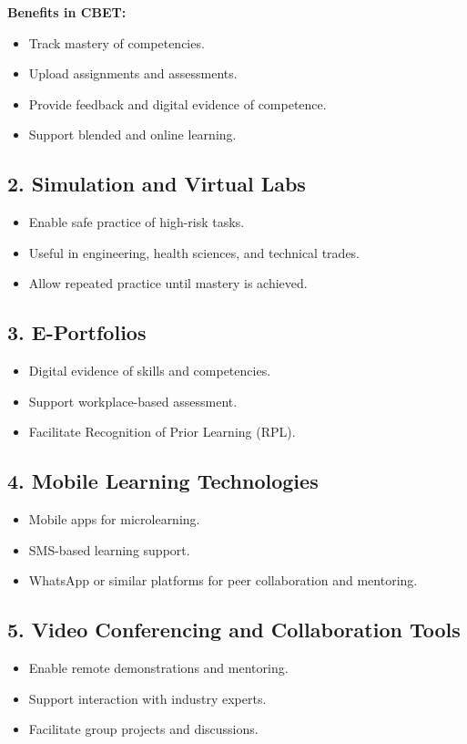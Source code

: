\documentclass[12pt,a4paper]{article}
\begin{document}
\textbf{Benefits in CBET:}
\begin{itemize}
    \item Track mastery of competencies.
    \item Upload assignments and assessments.
    \item Provide feedback and digital evidence of competence.
    \item Support blended and online learning.
\end{itemize}

\subsection*{2. Simulation and Virtual Labs}
\begin{itemize}
    \item Enable safe practice of high-risk tasks.
    \item Useful in engineering, health sciences, and technical trades.
    \item Allow repeated practice until mastery is achieved.
\end{itemize}

\subsection*{3. E-Portfolios}
\begin{itemize}
    \item Digital evidence of skills and competencies.
    \item Support workplace-based assessment.
    \item Facilitate Recognition of Prior Learning (RPL).
\end{itemize}

\subsection*{4. Mobile Learning Technologies}
\begin{itemize}
    \item Mobile apps for microlearning.
    \item SMS-based learning support.
    \item WhatsApp or similar platforms for peer collaboration and mentoring.
\end{itemize}

\subsection*{5. Video Conferencing and Collaboration Tools}
\begin{itemize}
    \item Enable remote demonstrations and mentoring.
    \item Support interaction with industry experts.
    \item Facilitate group projects and discussions.
\end{itemize}
\end{document}

